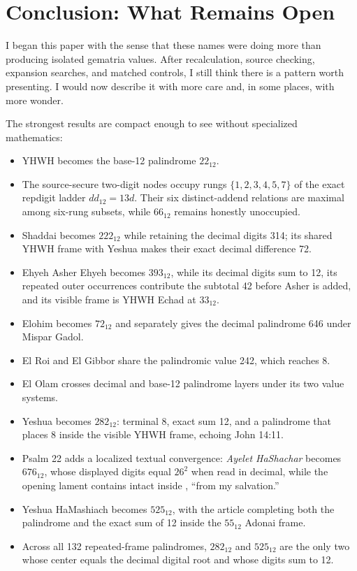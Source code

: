 \section{Conclusion: What Remains Open}

I began this paper with the sense that these names were doing more than producing isolated gematria values. After recalculation, source checking, expansion searches, and matched controls, I still think there is a pattern worth presenting. I would now describe it with more care and, in some places, with more wonder.

The strongest results are compact enough to see without specialized mathematics:

\begin{itemize}
\item YHWH becomes the base-12 palindrome $22_{12}$.
\item The source-secure two-digit nodes occupy rungs $\{1,2,3,4,5,7\}$ of the exact repdigit ladder $dd_{12}=13d$. Their six distinct-addend relations are maximal among six-rung subsets, while $66_{12}$ remains honestly unoccupied.
\item Shaddai becomes $222_{12}$ while retaining the decimal digits 314; its shared YHWH frame with Yeshua makes their exact decimal difference 72.
\item Ehyeh Asher Ehyeh becomes $393_{12}$, while its decimal digits sum to 12, its repeated outer occurrences contribute the subtotal 42 before Asher is added, and its visible frame is YHWH Echad at $33_{12}$.
\item Elohim becomes $72_{12}$ and separately gives the decimal palindrome 646 under Mispar Gadol.
\item El Roi and El Gibbor share the palindromic value 242, which reaches 8.
\item El Olam crosses decimal and base-12 palindrome layers under its two value systems.
\item Yeshua becomes $282_{12}$: terminal 8, exact sum 12, and a palindrome that places 8 inside the visible YHWH frame, echoing John 14:11.
\item Psalm 22 adds a localized textual convergence: \textit{Ayelet HaShachar} becomes $676_{12}$, whose displayed digits equal $26^2$ when read in decimal, while the opening lament contains  intact inside , ``from my salvation.''
\item Yeshua HaMashiach becomes $525_{12}$, with the article completing both the palindrome and the exact sum of 12 inside the $55_{12}$ Adonai frame.
\item Across all 132 repeated-frame palindromes, $282_{12}$ and $525_{12}$ are the only two whose center equals the decimal digital root and whose digits sum to 12.
\end{itemize}

